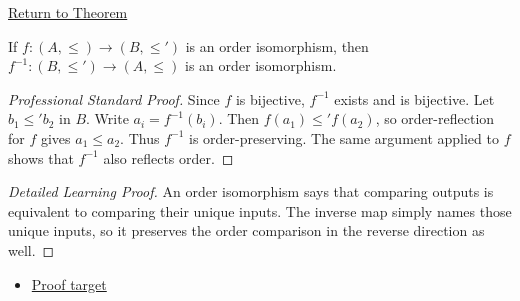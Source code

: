 \newpage
{}
\label{prf:inverse-order-isomorphism}

\begin{remark*}[Return]
\hyperref[thm:inverse-order-isomorphism]{Return to Theorem}
\end{remark*}

\begin{theorem*}
If $f:(A,\leq)\to(B,\leq')$ is an order isomorphism, then
$f^{-1}:(B,\leq')\to(A,\leq)$ is an order isomorphism.
\end{theorem*}

\begin{proof}[Professional Standard Proof]
\LRAProofBodyStart
Since $f$ is bijective, $f^{-1}$ exists and is bijective. Let
$b_1\leq' b_2$ in $B$. Write $a_i=f^{-1}(b_i)$. Then
$f(a_1)\leq' f(a_2)$, so order-reflection for $f$ gives $a_1\leq a_2$.
Thus $f^{-1}$ is order-preserving. The same argument applied to $f$ shows
that $f^{-1}$ also reflects order.
\end{proof}

\begin{proof}[Detailed Learning Proof]
\LRAProofBodyStart
An order isomorphism says that comparing outputs is equivalent to comparing
their unique inputs. The inverse map simply names those unique inputs, so it
preserves the order comparison in the reverse direction as well.
\end{proof}
\begin{remark*}
\end{remark*}



\begin{dependencies}
\begin{itemize}
  \item \hyperref[thm:inverse-order-isomorphism]{Proof target}
\end{itemize}
\end{dependencies}

\clearpage


